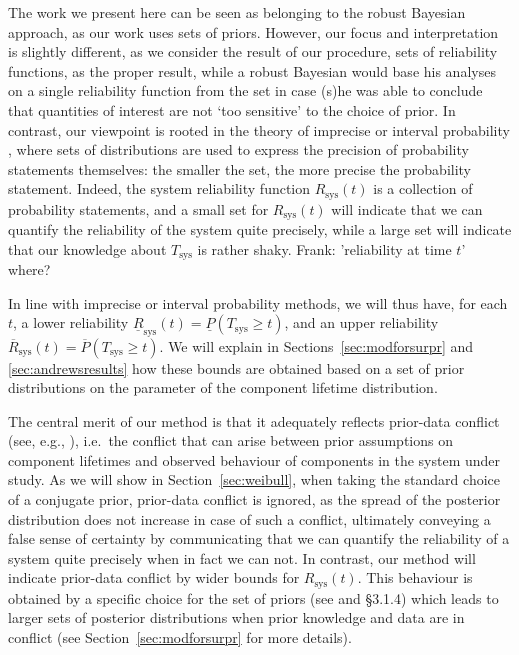 \documentclass[12pt,a4paper,twocolumn,fleqn]{narms}
\newcommand{\ul}[1]{\underline{#1}}
\newcommand{\ol}[1]{\overline{#1}}
\newcommand{\lRsys}{\ul{R}_\text{sys}}
\newcommand{\uRsys}{\ol{R}_\text{sys}}
\newcommand{\comments}[1]{{\small\color{gray} #1}}
\begin{document}
The work we present here can be seen as belonging to the robust Bayesian approach,
as our work uses sets of priors. However, our focus and interpretation is slightly different,
as we consider the result of our procedure, sets of reliability functions, as the proper result,
while a robust Bayesian would base his analyses on a single reliability function from the set
in case (s)he was able to conclude that quantities of interest are not `too sensitive' to the choice of prior.
In contrast, our viewpoint is rooted in the theory of imprecise or interval probability \cite{1991:walley,itip},
where sets of distributions are used to express the precision of probability statements themselves:
the smaller the set, the more precise the probability statement.
Indeed, the system reliability function $R_\text{sys}(t)$ is a collection of probability statements,
and a small set for $R_\text{sys}(t)$ will indicate that we can quantify the reliability of the system quite precisely,
while a large set will indicate that our knowledge about $T_\text{sys}$ is rather shaky.
\comments{Frank: 'reliability at time $t$' where?}

In line with imprecise or interval probability methods, we will thus have, for each $t$,
a lower reliability $\lRsys(t) = \ul{P}(T_\text{sys} \geq t)$,
and an upper reliability $\uRsys(t) = \ol{P}(T_\text{sys} \geq t)$.
We will explain in Sections~\ref{sec:modforsurpr} and \ref{sec:andrewsresults} how these bounds are obtained
based on a set of prior distributions on the parameter of the component lifetime distribution.

The central merit of our method is that it adequately reflects prior-data conflict
(see, e.g., ),
i.e.\ the conflict that can arise between prior assumptions on component lifetimes
and observed behaviour of components in the system under study.
As we will show in Section~\ref{sec:weibull}, when taking the standard choice of a conjugate prior,
prior-data conflict is ignored, as the spread of the posterior distribution does not increase in case of such a conflict,
ultimately conveying a false sense of certainty
by communicating that we can quantify the reliability of a system quite precisely when in fact we can not.
%
In contrast, our method will indicate prior-data conflict by wider bounds for $R_\text{sys}(t)$.
This behaviour is obtained by a specific choice for the set of priors (see  and  \S 3.1.4)
which leads to larger sets of posterior distributions when prior knowledge and data are in conflict
(see Section~\ref{sec:modforsurpr} for more details).
\end{document}
